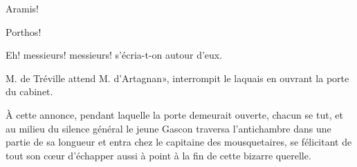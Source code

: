 \speak  Aramis! 

\speak  Porthos! 

\speak  Eh! messieurs! messieurs! s'écria-t-on autour d'eux. 

\speak  M. de Tréville attend M. d'Artagnan», interrompit le laquais en ouvrant la porte du cabinet. 

À cette annonce, pendant laquelle la porte demeurait ouverte, chacun se tut, et au milieu du silence général le jeune Gascon traversa l'antichambre dans une partie de sa longueur et entra chez le capitaine des mousquetaires, se félicitant de tout son cœur d'échapper aussi à point à la fin de cette bizarre querelle.